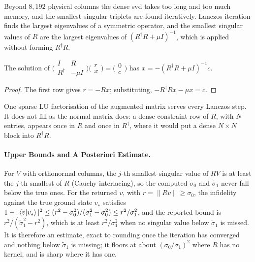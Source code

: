 Beyond $8{,}192$ physical columns the dense \gls{svd} takes too long and too much memory, and the smallest singular triplets are found iteratively. Lanczos iteration finds the largest eigenvalues of a symmetric operator, and the smallest singular values of $R$ are the largest eigenvalues of $(R^\dagger R+\mu I)^{-1}$, which is applied without forming $R^\dagger R$.

\begin{proposition}
The solution of $\bigl(\begin{smallmatrix}I&R\\R^\dagger&-\mu I\end{smallmatrix}\bigr)\bigl(\begin{smallmatrix}r\\x\end{smallmatrix}\bigr)=\bigl(\begin{smallmatrix}0\\c\end{smallmatrix}\bigr)$ has $x=-(R^\dagger R+\mu I)^{-1}c$.
\end{proposition}
\begin{proof}
The first row gives $r=-Rx$; substituting, $-R^\dagger Rx-\mu x=c$.
\end{proof}

One sparse LU factorisation of the augmented matrix serves every Lanczos step. It does not fill as the normal matrix does: a dense constraint row of $R$, with $N$ entries, appears once in $R$ and once in $R^\dagger$, where it would put a dense $N\times N$ block into $R^\dagger R$.

\paragraph{Upper Bounds and A Posteriori Estimate.} For $V$ with orthonormal columns, the $j$-th smallest singular value of $RV$ is at least the $j$-th smallest of $R$ (Cauchy interlacing), so the computed $\tilde\sigma_0$ and $\tilde\sigma_1$ never fall below the true ones. For the returned $v$, with $r=\|Rv\|\ge\sigma_0$, the infidelity against the true ground state $v_\star$ satisfies $1-|\braket{v|v_\star}|^2\le(r^2-\sigma_0^2)/(\sigma_1^2-\sigma_0^2)\le r^2/\sigma_1^2$, and the reported bound is $r^2/(\tilde\sigma_1^2-r^2)$, which is at least $r^2/\sigma_1^2$ when no singular value below $\tilde\sigma_1$ is missed. It is therefore an estimate, exact to rounding once the iteration has converged and nothing below $\tilde\sigma_1$ is missing; it floors at about $(\sigma_0/\sigma_1)^2$ where $R$ has no kernel, and is sharp where it has one.

